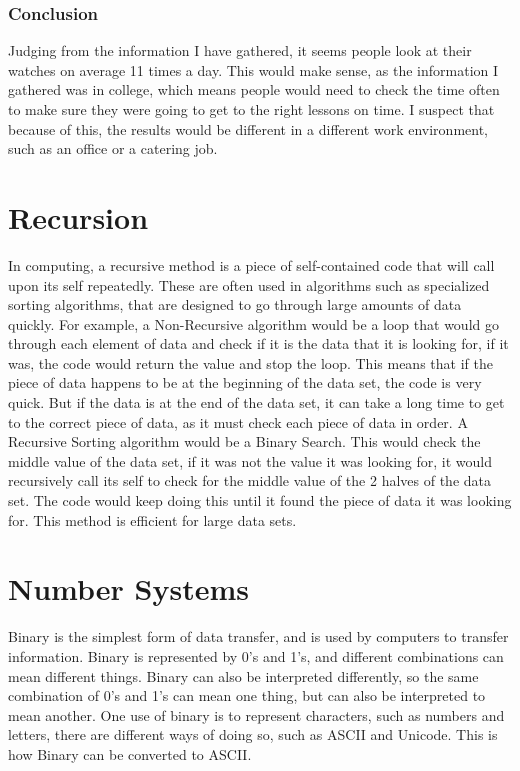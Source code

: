 \documentclass[a4paper,12pt]{article}
\begin{document}
\subsubsection{Conclusion}


Judging from the information I have gathered, it seems people look at their watches on average 11 times a day. This would make sense, as the information I gathered was in college, which means people would need to check the time often to make sure they were going to get to the right lessons on time. I suspect that because of this, the results would be different in a different work environment, such as an office or a catering job.

\newpage

\section{Recursion}
In computing, a recursive method is a piece of self-contained code that will call upon its self repeatedly. These are often used in algorithms such as specialized sorting algorithms, that are designed to go through large amounts of data quickly. For example, a Non-Recursive algorithm would be a loop that would go through each element of data and check if it is the data that it is looking for, if it was, the code would return the value and stop the loop. This means that if the piece of data happens to be at the beginning of the data set, the code is very quick. But if the data is at the end of the data set, it can take a long time to get to the correct piece of data, as it must check each piece of data in order.
A Recursive Sorting algorithm would be a Binary Search. This would check the middle value of the data set, if it was not the value it was looking for, it would recursively call its self to check for the middle value of the 2 halves of the data set. The code would keep doing this until it found the piece of data it was looking for. This method is efficient for large data sets.

\section{Number Systems}
Binary is the simplest form of data transfer, and is used by computers to transfer information. Binary is represented by 0’s and 1’s, and different combinations can mean different things. Binary can also be interpreted differently, so the same combination of 0’s and 1’s can mean one thing, but can also be interpreted to mean another. One use of binary is to represent characters, such as numbers and letters, there are different ways of doing so, such as ASCII and Unicode. This is how Binary can be converted to ASCII.
\end{document}
